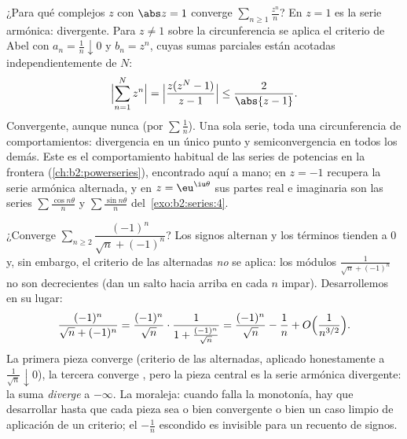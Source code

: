 \begin{example}\label{ex:b2:series:abelboundary}
¿Para qué complejos $z$ con $\abs z = 1$ converge $\sum_{n \geq 1}
\frac{z^n}{n}$? En $z = 1$ es la serie armónica: divergente. Para
$z \neq 1$ sobre la circunferencia se aplica el criterio de Abel
con $a_n = \frac1n \downarrow 0$ y $b_n = z^n$, cuyas sumas
parciales están acotadas independientemente de $N$:
\[
\Bigl|\sum_{n=1}^{N} z^n\Bigr|
= \Bigl|\frac{z(z^N - 1)}{z - 1}\Bigr|
\leq \frac{2}{\abs{z - 1}} .
\]
Convergente, aunque nunca  (por $\sum\frac1n$). Una
sola serie, toda una circunferencia de comportamientos:
divergencia en un único punto y semiconvergencia en todos los
demás. Este es el comportamiento habitual de las series de
potencias en la frontera (\cref{ch:b2:powerseries}), encontrado
aquí a mano; en $z = -1$ recupera la serie armónica alternada, y
en $z = \eu^{\iu\theta}$ sus partes real e imaginaria son las
series $\sum\frac{\cos n\theta}{n}$ y $\sum\frac{\sin
n\theta}{n}$ del~\cref{exo:b2:series:4}.
\end{example}

\begin{example}\label{ex:b2:series:trap}
¿Converge $\sum_{n\geq2} \dfrac{(-1)^n}{\sqrt n + (-1)^n}$? Los
signos alternan y los términos tienden a $0$ y, sin embargo, el
criterio de las alternadas \emph{no} se aplica: los módulos
$\frac{1}{\sqrt n + (-1)^n}$ no son decrecientes (dan un salto
hacia arriba en cada $n$ impar). Desarrollemos en su lugar:
\[
\frac{(-1)^n}{\sqrt n + (-1)^n}
= \frac{(-1)^n}{\sqrt n}\cdot
\frac{1}{1 + \frac{(-1)^n}{\sqrt n}}
= \frac{(-1)^n}{\sqrt n} - \frac{1}{n}
+ O\Bigl(\frac{1}{n^{3/2}}\Bigr).
\]
La primera pieza converge (criterio de las alternadas, aplicado
honestamente a $\frac1{\sqrt n}\downarrow0$), la tercera converge
, pero la pieza central es la serie armónica
divergente: la suma \emph{diverge} a $-\infty$. La moraleja: cuando
falla la monotonía, hay que desarrollar hasta que cada pieza sea o
bien  convergente o bien un caso limpio de aplicación
de un criterio; el $-\frac1n$ escondido es invisible para un
recuento de signos.
\end{example}

